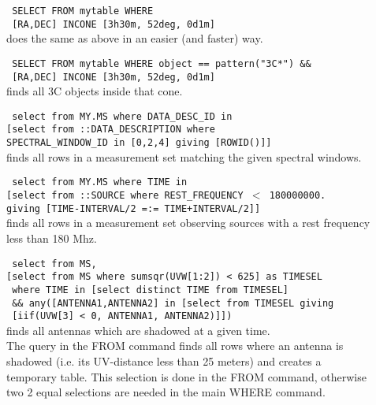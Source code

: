 \begin{description}
  \item[] \texttt{ SELECT FROM mytable WHERE}
     \\\texttt{ [RA,DEC] INCONE [3h30m, 52deg, 0d1m] }
     \\does the same as above in an easier (and faster) way.

  \item[] \texttt{ SELECT FROM mytable WHERE object == pattern("3C*") \&\&}
     \\\texttt{ [RA,DEC] INCONE [3h30m, 52deg, 0d1m] }
     \\finds all 3C objects inside that cone.

  \item[] \texttt{ select from MY.MS where DATA\_DESC\_ID in}
      \\\texttt{[select from ::DATA\_DESCRIPTION where}
      \\\texttt{SPECTRAL\_WINDOW\_ID in [0,2,4] giving [ROWID()]]}
      \\finds all rows in a measurement set matching the given
      spectral windows.

  \item[] \texttt{ select from MY.MS where TIME in}
      \\\texttt{[select from ::SOURCE where REST\_FREQUENCY $<$ 180000000.}
      \\\texttt{giving [TIME-INTERVAL/2 =:= TIME+INTERVAL/2]]}
      \\finds all rows in a measurement set observing sources with a
      rest frequency less than 180 Mhz.

  \item[] \texttt{ select from MS,}
      \\\texttt{[select from MS where sumsqr(UVW[1:2]) < 625] as TIMESEL}
      \\\texttt{ where TIME in [select distinct TIME from TIMESEL]}
      \\\texttt{   \&\& any([ANTENNA1,ANTENNA2] in [select from TIMESEL giving}
      \\\texttt{                      [iif(UVW[3] < 0, ANTENNA1, ANTENNA2)]])}
      \\finds all antennas which are shadowed at a given time.
      \\The query in the FROM command finds all rows where an antenna
      is shadowed (i.e. its UV-distance less than 25 meters) and
      creates a temporary table. This selection is done in the FROM
      command, otherwise two 2 equal selections are needed in the main
      WHERE command.
      

\end{description}
